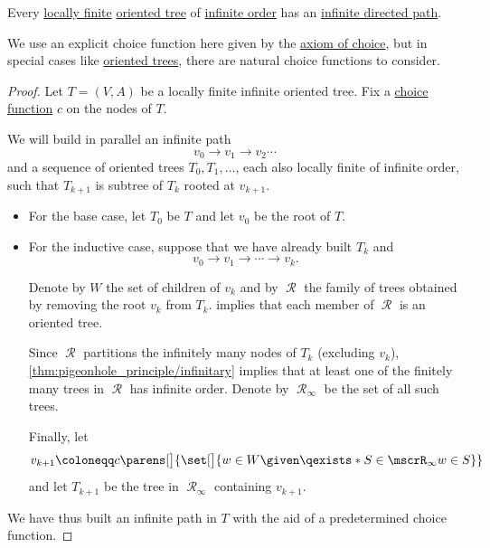 \begin{lemma}\label{thm:konigs_infinity_lemma_oriented}
  Every \hyperref[def:graph_cardinality/local]{locally finite} \hyperref[def:oriented_tree]{oriented tree} of \hyperref[def:graph_cardinality/order]{infinite order} has an \hyperref[def:graph_walk/path]{infinite directed path}.
\end{lemma}
\begin{comments}
  \item We use an explicit choice function here given by the \hyperref[def:zfc/choice]{axiom of choice}, but in special cases like \hyperref[def:oriented_tree]{oriented trees}, there are natural choice functions to consider.
\end{comments}
\begin{proof}
  Let \( T = (V, A) \) be a locally finite infinite oriented tree. Fix a \hyperref[def:choice_function]{choice function} \( c \) on the nodes of \( T \).

  We will build in parallel an infinite path
  \begin{equation*}
    v_0 \to v_1 \to v_2 \cdots
  \end{equation*}
  and a sequence of oriented trees \( T_0, T_1, \ldots \), each also locally finite of infinite order, such that \( T_{k+1} \) is subtree of \( T_k \) rooted at \( v_{k+1} \).

  \begin{itemize}
    \item For the base case, let \( T_0 \) be \( T \) and let \( v_0 \) be the root of \( T \).

    \item For the inductive case, suppose that we have already built \( T_k \) and
    \begin{equation*}
      v_0 \to v_1 \to \cdots \to v_k.
    \end{equation*}

    Denote by \( W \) the set of children of \( v_k \) and by \( \mscrR \) the family of trees obtained by removing the root \( v_k \) from \( T_k \).  implies that each member of \( \mscrR \) is an oriented tree.

    Since \( \mscrR \) partitions the infinitely many nodes of \( T_k \) (excluding \( v_k \)), \cref{thm:pigeonhole_principle/infinitary} implies that at least one of the finitely many trees in \( \mscrR \) has infinite order. Denote by \( \mscrR_\infty \) be the set of all such trees.

    Finally, let
    \begin{equation*}
      v_{k+1} \coloneqq c\parens[\big]{ \set[\big]{ w \in W \given \qexists* {S \in \mscrR_\infty} w \in S } }
    \end{equation*}
    and let \( T_{k+1} \) be the tree in \( \mscrR_\infty \) containing \( v_{k+1} \).
  \end{itemize}

  We have thus built an infinite path in \( T \) with the aid of a predetermined choice function.
\end{proof}

